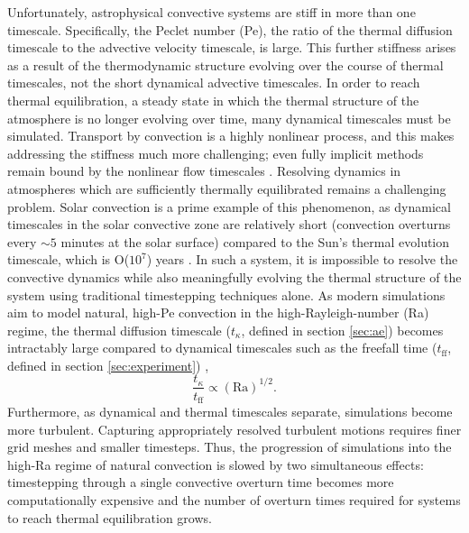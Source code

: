 \documentclass[aps, pre, onecolumn, nofootinbib, notitlepage, groupedaddress, amsfonts, amssymb, amsmath, longbibliography]{revtex4-1}
\begin{document}
Unfortunately, astrophysical convective systems are stiff in more than one 
timescale. Specifically, the Peclet number (Pe), the ratio of the thermal
diffusion timescale to the advective velocity timescale, is large.
This further stiffness arises as a result of the thermodynamic structure 
evolving over the course of thermal timescales, not the short dynamical advective
timescales. In order to reach thermal equilibration, a steady state in which
the thermal structure of the atmosphere is no longer evolving over time,
many dynamical timescales must be simulated.
Transport by convection is a highly nonlinear process,
and this makes addressing the stiffness much more challenging; even fully
implicit  methods remain bound by the nonlinear flow timescales
\cite{viallet&all2011, viallet&all2013, viallet&all2016}. 
Resolving dynamics in atmospheres which are sufficiently
thermally equilibrated remains a challenging problem.
Solar convection is a prime example of this phenomenon, as
dynamical timescales in the solar convective zone are relatively short 
(convection overturns every $\sim 5$ minutes at the solar surface)
compared to the Sun's thermal evolution timescale, which is O($10^7$) years
\cite{stix2003}.  
In such a system, it is impossible to resolve the convective dynamics while also
meaningfully evolving the thermal structure of the system using
traditional timestepping techniques alone.
As modern simulations aim to model natural, high-Pe convection
in the high-Rayleigh-number (Ra) regime,
the thermal diffusion timescale ($t_{\kappa}$, defined in section \ref{sec:ae}) 
becomes intractably large compared to dynamical timescales 
such as the freefall time ($t_{\text{ff}}$, defined in section \ref{sec:experiment})
\cite{anders&brown2017}, 
\begin{equation}
\frac{t_{\kappa}}{t_{\text{ff}}} \propto (\text{Ra})^{1/2}.
\end{equation}
Furthermore, as dynamical and thermal timescales separate, 
simulations become more turbulent. Capturing appropriately resolved
turbulent motions requires finer grid meshes and smaller timesteps.
Thus, the progression of simulations into the high-Ra
regime of natural convection is slowed by two simultaneous effects: timestepping
through a single convective overturn time becomes more computationally expensive
and the number of overturn times required for systems to reach thermal equilibration
grows.
\end{document}
